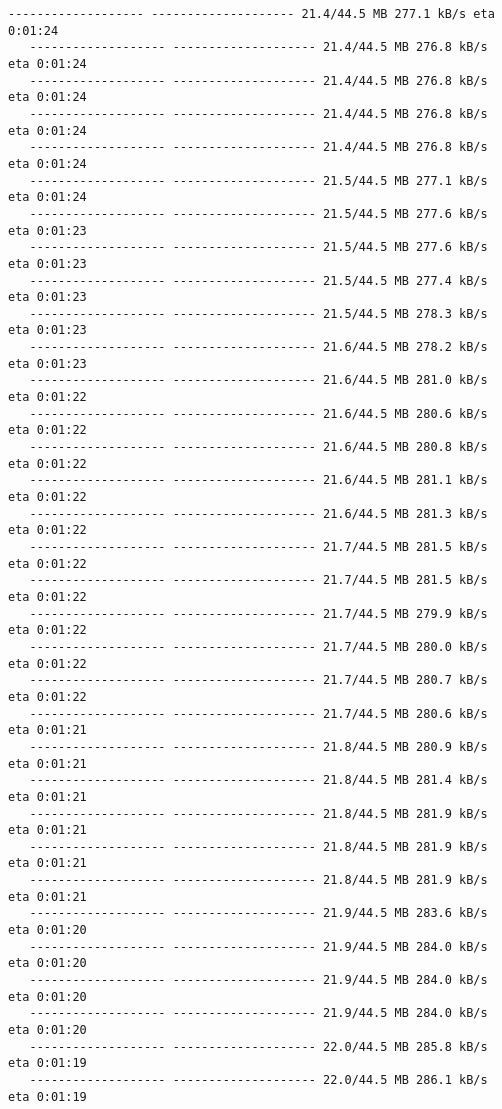 \documentclass[11pt]{article}
\begin{document}
\begin{Verbatim}[commandchars=\\\{\}]
   ------------------- -------------------- 21.4/44.5 MB 277.1 kB/s eta 0:01:24
   ------------------- -------------------- 21.4/44.5 MB 276.8 kB/s eta 0:01:24
   ------------------- -------------------- 21.4/44.5 MB 276.8 kB/s eta 0:01:24
   ------------------- -------------------- 21.4/44.5 MB 276.8 kB/s eta 0:01:24
   ------------------- -------------------- 21.4/44.5 MB 276.8 kB/s eta 0:01:24
   ------------------- -------------------- 21.5/44.5 MB 277.1 kB/s eta 0:01:24
   ------------------- -------------------- 21.5/44.5 MB 277.6 kB/s eta 0:01:23
   ------------------- -------------------- 21.5/44.5 MB 277.6 kB/s eta 0:01:23
   ------------------- -------------------- 21.5/44.5 MB 277.4 kB/s eta 0:01:23
   ------------------- -------------------- 21.5/44.5 MB 278.3 kB/s eta 0:01:23
   ------------------- -------------------- 21.6/44.5 MB 278.2 kB/s eta 0:01:23
   ------------------- -------------------- 21.6/44.5 MB 281.0 kB/s eta 0:01:22
   ------------------- -------------------- 21.6/44.5 MB 280.6 kB/s eta 0:01:22
   ------------------- -------------------- 21.6/44.5 MB 280.8 kB/s eta 0:01:22
   ------------------- -------------------- 21.6/44.5 MB 281.1 kB/s eta 0:01:22
   ------------------- -------------------- 21.6/44.5 MB 281.3 kB/s eta 0:01:22
   ------------------- -------------------- 21.7/44.5 MB 281.5 kB/s eta 0:01:22
   ------------------- -------------------- 21.7/44.5 MB 281.5 kB/s eta 0:01:22
   ------------------- -------------------- 21.7/44.5 MB 279.9 kB/s eta 0:01:22
   ------------------- -------------------- 21.7/44.5 MB 280.0 kB/s eta 0:01:22
   ------------------- -------------------- 21.7/44.5 MB 280.7 kB/s eta 0:01:22
   ------------------- -------------------- 21.7/44.5 MB 280.6 kB/s eta 0:01:21
   ------------------- -------------------- 21.8/44.5 MB 280.9 kB/s eta 0:01:21
   ------------------- -------------------- 21.8/44.5 MB 281.4 kB/s eta 0:01:21
   ------------------- -------------------- 21.8/44.5 MB 281.9 kB/s eta 0:01:21
   ------------------- -------------------- 21.8/44.5 MB 281.9 kB/s eta 0:01:21
   ------------------- -------------------- 21.8/44.5 MB 281.9 kB/s eta 0:01:21
   ------------------- -------------------- 21.9/44.5 MB 283.6 kB/s eta 0:01:20
   ------------------- -------------------- 21.9/44.5 MB 284.0 kB/s eta 0:01:20
   ------------------- -------------------- 21.9/44.5 MB 284.0 kB/s eta 0:01:20
   ------------------- -------------------- 21.9/44.5 MB 284.0 kB/s eta 0:01:20
   ------------------- -------------------- 22.0/44.5 MB 285.8 kB/s eta 0:01:19
   ------------------- -------------------- 22.0/44.5 MB 286.1 kB/s eta 0:01:19

\end{Verbatim}
\end{document}
